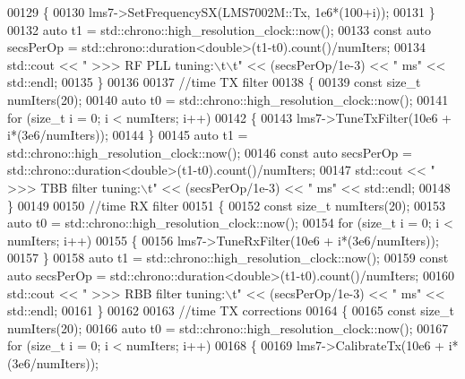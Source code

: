 \begin{DoxyCode}
00129         \{
00130             lms7->SetFrequencySX(LMS7002M::Tx, 1e6*(100+i));
00131         \}
00132         \textcolor{keyword}{auto} t1 = std::chrono::high\_resolution\_clock::now();
00133         \textcolor{keyword}{const} \textcolor{keyword}{auto} secsPerOp = std::chrono::duration<double>(t1-t0).count()/numIters;
00134         std::cout << \textcolor{stringliteral}{"  >>> RF PLL tuning:\(\backslash\)t\(\backslash\)t"} << (secsPerOp/1e-3) << \textcolor{stringliteral}{" ms"} << std::endl;
00135     \}
00136 
00137     \textcolor{comment}{//time TX filter}
00138     \{
00139         \textcolor{keyword}{const} \textcolor{keywordtype}{size\_t} numIters(20);
00140         \textcolor{keyword}{auto} t0 = std::chrono::high\_resolution\_clock::now();
00141         \textcolor{keywordflow}{for} (\textcolor{keywordtype}{size\_t} i = 0; i < numIters; i++)
00142         \{
00143             lms7->TuneTxFilter(10e6 + i*(3e6/numIters));
00144         \}
00145         \textcolor{keyword}{auto} t1 = std::chrono::high\_resolution\_clock::now();
00146         \textcolor{keyword}{const} \textcolor{keyword}{auto} secsPerOp = std::chrono::duration<double>(t1-t0).count()/numIters;
00147         std::cout << \textcolor{stringliteral}{"  >>> TBB filter tuning:\(\backslash\)t"} << (secsPerOp/1e-3) << \textcolor{stringliteral}{" ms"} << std::endl;
00148     \}
00149 
00150     \textcolor{comment}{//time RX filter}
00151     \{
00152         \textcolor{keyword}{const} \textcolor{keywordtype}{size\_t} numIters(20);
00153         \textcolor{keyword}{auto} t0 = std::chrono::high\_resolution\_clock::now();
00154         \textcolor{keywordflow}{for} (\textcolor{keywordtype}{size\_t} i = 0; i < numIters; i++)
00155         \{
00156             lms7->TuneRxFilter(10e6 + i*(3e6/numIters));
00157         \}
00158         \textcolor{keyword}{auto} t1 = std::chrono::high\_resolution\_clock::now();
00159         \textcolor{keyword}{const} \textcolor{keyword}{auto} secsPerOp = std::chrono::duration<double>(t1-t0).count()/numIters;
00160         std::cout << \textcolor{stringliteral}{"  >>> RBB filter tuning:\(\backslash\)t"} << (secsPerOp/1e-3) << \textcolor{stringliteral}{" ms"} << std::endl;
00161     \}
00162 
00163     \textcolor{comment}{//time TX corrections}
00164     \{
00165         \textcolor{keyword}{const} \textcolor{keywordtype}{size\_t} numIters(20);
00166         \textcolor{keyword}{auto} t0 = std::chrono::high\_resolution\_clock::now();
00167         \textcolor{keywordflow}{for} (\textcolor{keywordtype}{size\_t} i = 0; i < numIters; i++)
00168         \{
00169             lms7->CalibrateTx(10e6 + i*(3e6/numIters));

\end{DoxyCode}
